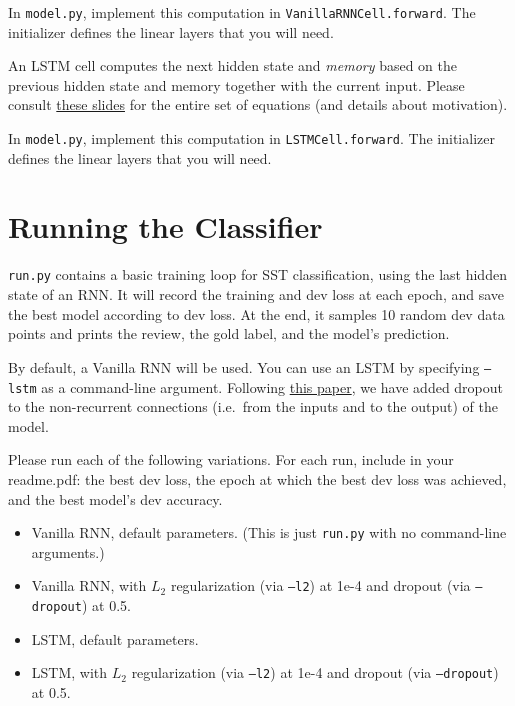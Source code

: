 \documentclass[11pt]{article}
\begin{document}
\noindent In \texttt{model.py}, implement this computation in \texttt{VanillaRNNCell.forward}.  The initializer defines the linear layers that you will need.


\vspace{2em}
 An LSTM cell computes the next hidden state and \emph{memory} based on the previous hidden state and memory together with the current input.  Please consult \href{https://www.shane.st/teaching/575k/spr21/slides/8_lstm.pdf}{these slides} for the entire set of equations (and details about motivation).

\noindent In \texttt{model.py}, implement this computation in \texttt{LSTMCell.forward}.  The initializer defines the linear layers that you will need.



\section{Running the Classifier}

\texttt{run.py} contains a basic training loop for SST classification, using the last hidden state of an RNN. It will record the training and dev loss at each epoch, and save the best model according to dev loss.  At the end, it samples 10 random dev data points and prints the review, the gold label, and the model's prediction.

\vspace{2em}
 By default, a Vanilla RNN will be used.  You can use an LSTM by specifying \texttt{--lstm} as a command-line argument.  Following \href{https://arxiv.org/abs/1409.2329}{this paper}, we have added dropout to the non-recurrent connections (i.e.\ from the inputs and to the output) of the model.

\noindent Please run each of the following variations.  For each run, include in your readme.pdf: the best dev loss, the epoch at which the best dev loss was achieved, and the best model's dev accuracy.
\begin{itemize}
  \item Vanilla RNN, default parameters.  (This is just \texttt{run.py} with no command-line arguments.)
  \item Vanilla RNN, with $L_2$ regularization (via \texttt{--l2}) at 1e-4 and dropout (via \texttt{--dropout}) at 0.5.
  \item LSTM, default parameters. 
  \item LSTM, with $L_2$ regularization (via \texttt{--l2}) at 1e-4 and dropout (via \texttt{--dropout}) at 0.5.
\end{itemize}
\end{document}
